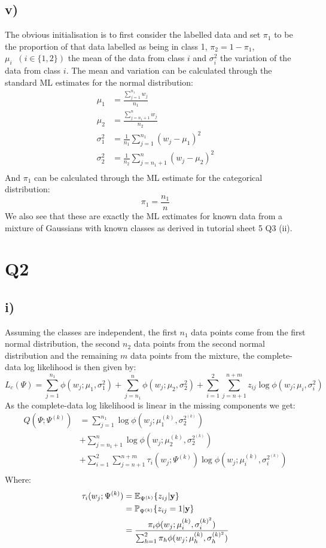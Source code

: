 \documentclass{article}
\begin{document}
\subsection*{v)}
The obvious initialisation is to first consider the labelled data and set $\pi_1$ to be the proportion of that data labelled as being in class 1, $\pi_2=1-\pi_1$, $\mu_i\;\;(i\in\{1,2\})$ the mean of the data from class $i$ and $\sigma_i^2$ the variation of the data from class $i$. The mean and variation can be calculated through the standard ML estimates for the normal distribution:
\begin{align*}
\mu_1&=\frac{\sum_{j=1}^{n_1}w_j}{n_1}\\
\mu_2&=\frac{\sum_{j=n_1+1}^{n}w_j}{n_2}\\
\sigma_1^2&=\frac{1}{n_1}\sum_{j=1}^{n_1}(w_j-\mu_1)^2\\
\sigma_2^2&=\frac{1}{n_2}\sum_{j=n_1+1}^{n}(w_j-\mu_2)^2\\
\end{align*}
And $\pi_1$ can be calculated through the ML estimate for the categorical distribution:
$$\pi_1=\frac{n_1}{n}$$
We also see that these are exactly the ML extimates for known data from a mixture of Gaussians with known classes as derived in tutorial sheet 5 Q3 (ii).
\section*{Q2}
\subsection*{i)}
Assuming the classes are independent, the first $n_1$ data points come from the first normal distribution, the second $n_2$ data points from the second normal distribution and the remaining $m$ data points from the mixture, the complete-data log likelihood is then given by:
$$L_{c}(\Psi)=\sum_{j=1}^{n_1}\phi(w_j;\mu_1,\sigma_1^2)+\sum_{j=n_1}^{n}\phi(w_j;\mu_2,\sigma_2^2)+\sum_{i=1}^{2}\sum_{j=n+1}^{n+m}z_{ij}\log\phi(w_j;\mu_i,\sigma_i^2)$$
As the complete-data log likelihood is linear in the missing components we get:
\begin{align*}
Q(\Psi;\Psi^{(k)})&=\sum_{j=1}^{n_1}\log\phi(w_j;\mu_1^{(k)},\sigma_2^{2^{(k)}})\\
&+\sum_{j=n_1+1}^{n}\log\phi(w_j;\mu_2^{(k)},\sigma_2^{2^{(k)}})\\
&+\sum_{i=1}^{2}\sum_{j=n+1}^{n+m}\tau_{i}(w_j;\Psi^{(k)})\log\phi(w_j;\mu_i^{(k)},\sigma_i^{2^{(k)}})\\
\end{align*}
Where:
\begin{align*}
\tau_{i}(w_j;\Psi^{(k)})&=\mathbb{E}_{\Psi^{(k)}}\{z_{ij}|\bold{y}\}\\
&=\mathbb{P}_{\Psi^{(k)}}\{z_{ij}=1|\bold{y}\}\\
&=\frac{\pi_i\phi(w_j;\mu_i^{(k)},\sigma_i^{(k)^2})}{\sum_{h=1}^{2}\pi_{h}\phi(w_j;\mu_h^{(k)},\sigma_h^{(k)^2})}\\
\end{align*}
\end{document}
